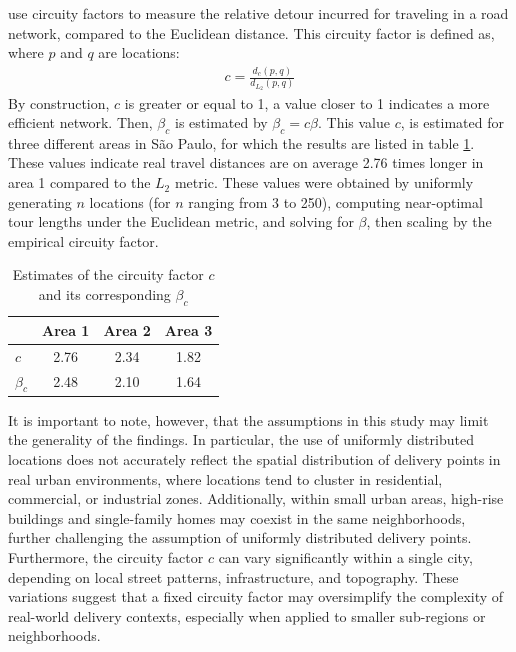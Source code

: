 \documentclass[12pt]{article}
\numberwithin{equation}{section}
\newcommand{\1}[1]{\,I_{#1}} %
\begin{document}
\citet{merchan2019empirical} use circuity factors to measure the relative detour incurred for
traveling in a road network, compared to the Euclidean distance. This circuity factor is defined
as, where $p$ and $q$ are locations:
\begin{align}
	c = \frac{d_{c}(p,q)}{d_{L_{2}}(p,q)}
	\label{eq:circuity}
\end{align}
By construction, $c$ is greater or equal to 1, a value closer to 1 indicates a more efficient network. Then, $\beta_c$
is estimated by $\beta_c=c\beta$. This value $c$, is estimated for three different areas in
São Paulo, for which the results are listed in table \ref{tab:beta-merchan}. These values indicate
real travel distances are on average 2.76 times longer in area 1 compared to the $L_2$ metric.
These values were obtained by uniformly generating $n$ locations (for $n$ ranging from 3 to 250),
computing near-optimal tour lengths under the Euclidean metric, and solving for $\beta$, then
scaling by the empirical circuity factor.
\begin{table}[htbp]
	\centering
	\caption{Estimates of the circuity factor $c$ and its corresponding $\beta_c$ \citep{merchan2019empirical}}
	\label{tab:beta-merchan}
	\begin{tabular}{lccc}
		\toprule
		          & Area 1 & Area 2 & Area 3 \\
		\midrule
		$c$       & 2.76   & 2.34   & 1.82   \\
		$\beta_c$ & 2.48   & 2.10   & 1.64   \\
		\bottomrule
	\end{tabular}
\end{table}
It is important to note, however, that the assumptions in this study may limit the generality of
the findings. In particular, the use of uniformly distributed locations does not accurately reflect
the spatial distribution of delivery points in real urban environments, where locations tend to
cluster in residential, commercial, or industrial zones. Additionally, within small urban areas,
high-rise buildings and single-family homes may coexist in the same neighborhoods, further
challenging the assumption of uniformly distributed delivery points.
Furthermore, the circuity factor $c$ can
vary significantly within a single city, depending on local street patterns, infrastructure, and
topography. These variations suggest that a fixed circuity factor may oversimplify the complexity
of real-world delivery contexts, especially when applied to smaller sub-regions or neighborhoods.
\end{document}
